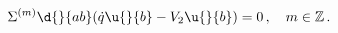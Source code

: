 \begin{equation*}
  \Sigma^{(m)}\d{}{a b}(\dot{q}\u{}{b} - V_{2}\u{}{b}) = 0\,,\quad {m} \in \mathbb{Z}\,.
\end{equation*}

